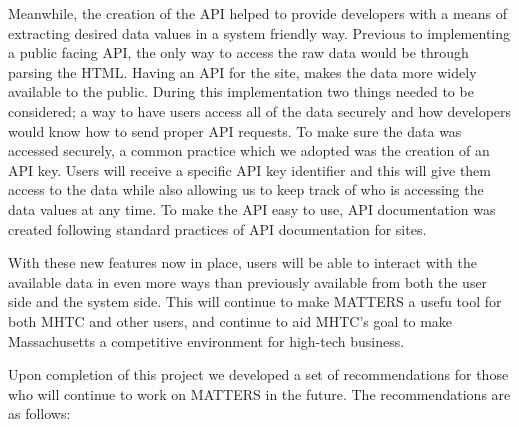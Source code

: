  Meanwhile, the creation of the API helped to provide developers with a means of extracting desired data values in a system friendly way. Previous to implementing a public facing API, the only way to access the raw data would be through parsing the HTML. Having an API for the site, makes the data more widely available to the public. During this implementation two things needed to be considered; a way to have users access all of the data securely and how developers would know how to send proper API requests. To make sure the data was accessed securely, a common practice which we adopted was the creation of an API key. Users will receive a specific API key identifier and this will give them access to the data while also allowing us to keep track of who is accessing the data values at any time. To make the API easy to use, API documentation was created following standard practices of API documentation for sites.
 
 With these new features now in place, users will be able to interact with the available data in even more ways than previously available from both the user side and the system side. This will continue to make MATTERS a usefu tool for both MHTC and other users, and continue to aid MHTC's goal to make Massachusetts a competitive environment for high-tech business.
 
 Upon completion of this project we developed a set of recommendations for those who will continue to work on MATTERS in the future. The recommendations are as follows:
 
